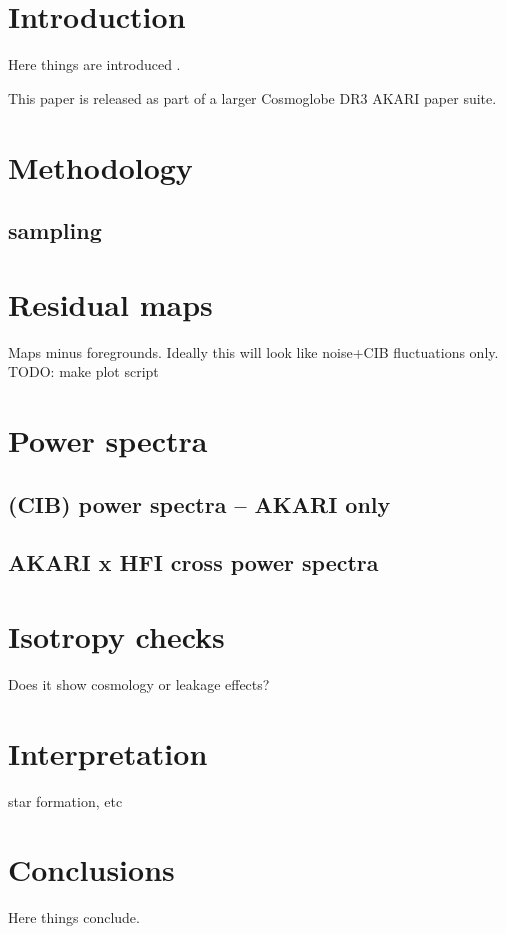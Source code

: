 \documentclass{aa}
\newcommand{\comment}[1]{{\color{teal}#1}}
\begin{document}
   \maketitle

\setcounter{tocdepth}{2}
\tableofcontents
   
\section{Introduction}
\comment{Here things are introduced \citep{planck2016-l01}.}

	   This paper is released as part of a larger Cosmoglobe DR3 AKARI paper suite. 

%
\section{Methodology}
\label{sec:methodology}
\subsection{sampling}

%
\section{Residual maps}
\label{sec:residual-maps}
\comment{Maps minus foregrounds. Ideally this will look like noise+CIB fluctuations only. TODO: make plot script}

%
\section{Power spectra}
\label{sec:power-spectra}

\subsection{(CIB) power spectra -- AKARI only}
\subsection{AKARI x HFI cross power spectra}

%
\section{Isotropy checks}
\label{sec:isotropy}
\comment{Does it show cosmology or leakage effects?}

%
\section{Interpretation}
\label{sec:interpretation}
\comment{star formation, etc}

\section{Conclusions}
\label{sec:conclusions}
\comment{Here things conclude.}




\end{document}
